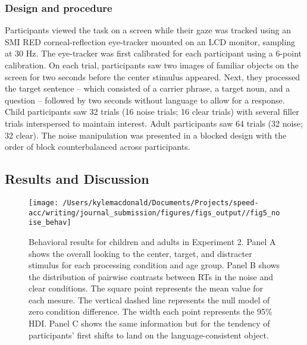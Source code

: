 \documentclass[,man,floatsintext]{apa6}
\begin{document}
\hypertarget{design-and-procedure-1}{%
\subsubsection{Design and procedure}\label{design-and-procedure-1}}

Participants viewed the task on a screen while their gaze was tracked using an SMI RED corneal-reflection eye-tracker mounted on an LCD monitor, sampling at 30 Hz. The eye-tracker was first calibrated for each participant using a 6-point calibration. On each trial, participants saw two images of familiar objects on the screen for two seconds before the center stimulus appeared. Next, they processed the target sentence -- which consisted of a carrier phrase, a target noun, and a question -- followed by two seconds without language to allow for a response. Child participants saw 32 trials (16 noise trials; 16 clear trials) with several filler trials interspersed to maintain interest. Adult participants saw 64 trials (32 noise; 32 clear). The noise manipulation was presented in a blocked design with the order of block counterbalanced across participants.

\hypertarget{results-and-discussion}{%
\subsection{Results and Discussion}\label{results-and-discussion}}

\begin{figure}[!t]

{\centering \texttt{[image: /Users/kylemacdonald/Documents/Projects/speed-acc/writing/journal\_submission/figures/figs\_output//fig5\_noise\_behav]} 

}

\caption{Behavioral results for children and adults in Experiment 2. Panel A shows the overall looking to the center, target, and distracter stimulus for each processing condition and age group. Panel B shows the distribution of pairwise contrasts between RTs in the noise and clear conditions. The square point represents the mean value for each mesure. The vertical dashed line represents the null model of zero condition difference. The width each point represents the 95\% HDI. Panel C shows the same information but for the tendency of participants' first shifts to land on the language-consistent object.}\label{fig:noise-acc-rt-plot}
\end{figure}
\end{document}
